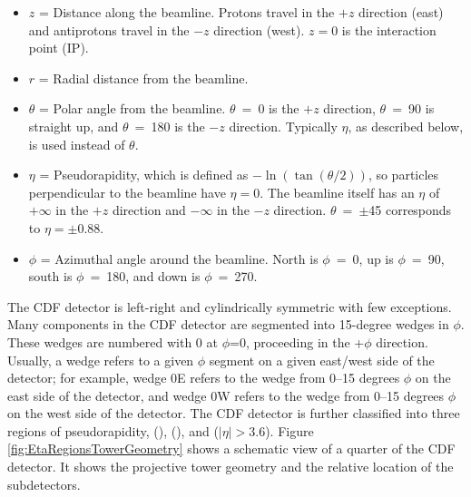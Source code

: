\vspace{-0.015\textheight}
\begin{singlespace}
\begin{itemize}{}{}
\item{$z$ = Distance along the beamline. Protons travel in the $+z$ direction (east) and antiprotons travel in the $-z$ direction (west). $z=0$ is the interaction point (IP).}
\item{$r$ = Radial distance from the beamline.}
\item{$\theta$ = Polar angle from the beamline. \mbox{$\theta$ = 0\degree} is the $+z$ direction, \mbox{$\theta$ = 90\degree} is straight up, and \mbox{$\theta$ = 180\degree} is the $-z$ direction. Typically $\eta$, as described below, is used instead of $\theta$.}
\item{$\eta$ = Pseudorapidity, which is defined as $-\ln(\tan(\theta/2))$, so particles perpendicular to the beamline have $\eta = 0$. The beamline itself has an $\eta$ of $+\infty$ in the $+z$ direction and $-\infty$ in the $-z$ direction. \mbox{$\theta$ = $\pm$45\degree} corresponds to \mbox{$\eta=\pm$0.88}.}
\item{$\phi$ = Azimuthal angle around the beamline. North is \mbox{$\phi$ = 0}, up is \mbox{$\phi$ = 90\degree}, south is \mbox{$\phi$ = 180\degree}, and down is \mbox{$\phi$ = 270\degree}.}
\end{itemize}
\end{singlespace}

The CDF detector is left-right and cylindrically symmetric with few exceptions. Many components in the CDF detector are segmented into \mbox{15-degree} wedges in $\phi$. These wedges are numbered with 0 at \mbox{$\phi$=0}, proceeding in the \mbox{+$\phi$} direction. Usually, a wedge refers to a given $\phi$ segment on a given east/west side of the detector; for example, wedge 0E refers to the wedge from \mbox{0--15} degrees $\phi$ on the east side of the detector, and wedge 0W refers to the wedge from \mbox{0--15} degrees $\phi$ on the west side of the detector. The CDF detector is further classified into three regions of pseudorapidity,  (),  (), and  ($|\eta|>3.6$). Figure \ref{fig:EtaRegionsTowerGeometry} shows a schematic view of a quarter of the CDF detector. It shows the projective tower geometry and the relative location of the subdetectors.

